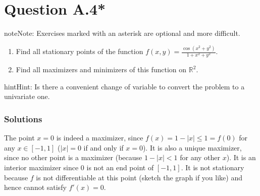 \documentclass[letterpaper,10pt,english]{jupyterBook}
\begin{document}
\section{Question A.4*}
\label{\detokenize{02.exercises:question-a-4}}
\begin{sphinxadmonition}{note}{Note:}
\sphinxAtStartPar
Exercises marked with an asterisk \sphinxstylestrong{(*)} are optional and more difficult.
\end{sphinxadmonition}
\begin{enumerate}
%
\item {} 
\sphinxAtStartPar
Find all stationary points of the function
\(f(x, y) = \frac{\cos(x^2 + y^2)}{1 + x^2 + y^2}\).

\item {} 
\sphinxAtStartPar
Find all maximizers and minimizers of this function on \(\mathbb{R}^2\).

\end{enumerate}

\begin{sphinxadmonition}{hint}{Hint:}
\sphinxAtStartPar
Is there a convenient change of variable to convert the problem to a univariate one.
\end{sphinxadmonition}
\subsubsection*{Solutions}

\sphinxAtStartPar
{}

\sphinxAtStartPar
The point \(x=0\) is indeed a maximizer, since \(f(x) = 1 -|x| \leq 1 = f(0)\) for any \(x \in [-1, 1]\) (\(|x|=0\) if and only if \(x=0\)).
It is also a unique maximizer, since no other point is a maximizer (because \(1 -|x| < 1\) for any other \(x\)).
It is an interior maximizer since \(0\) is not an end point of \([-1, 1]\).
It is not stationary because \(f\) is not differentiable at this point (sketch the graph if you like) and hence cannot satisfy \(f'(x)=0\).

\sphinxAtStartPar
{}
\end{document}
